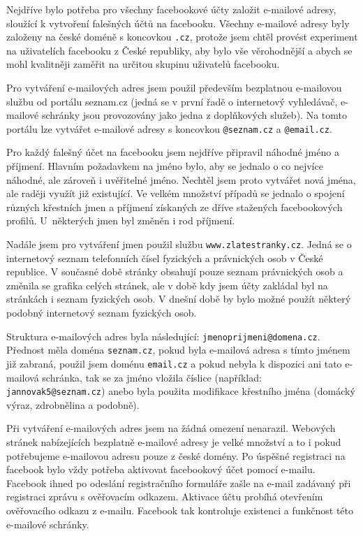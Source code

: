 \documentclass[thesis=M,czech]{FITthesis}[2013/05/10]
\begin{document}
Nejdříve bylo potřeba pro všechny facebookové účty založit e-mailové adresy, sloužící k vytvoření falešných účtů na facebooku. Všechny e-mailové adresy byly založeny na české doméně s koncovkou \verb|.cz|, protože jsem chtěl provést experiment na uživatelích facebooku z České republiky, aby bylo vše věrohodnější a abych se mohl kvalitněji zaměřit na určitou skupinu uživatelů facebooku. 

Pro vytváření e-mailových adres jsem použil především bezplatnou e-mailovou službu od portálu seznam.cz (jedná se v první řadě o internetový vyhledávač, e-mailové schránky jsou provozovány jako jedna z doplňkových služeb). Na tomto portálu lze vytvářet e-mailové adresy s koncovkou \verb|@seznam.cz| a \verb|@email.cz|.

Pro každý falešný účet na facebooku jsem nejdříve připravil náhodné jméno a příjmení. Hlavním požadavkem na jméno bylo, aby se jednalo o co nejvíce náhodné, ale zároveň i uvěřitelné jméno. Nechtěl jsem proto vytvářet nová jména, ale raději využít již existující. Ve velkém množství případů se jednalo o spojení různých křestních jmen a příjmení získaných ze dříve stažených facebookových profilů. U~některých jmen byl změněn i rod příjmení. 

Nadále jsem pro vytváření jmen použil službu \verb|www.zlatestranky.cz|. Jedná se o internetový seznam telefonních čísel fyzických a právnických osob v České republice. V současné době stránky obsahují pouze seznam právnických osob a změnila se grafika celých stránek, ale v době kdy jsem účty zakládal byl na stránkách i seznam fyzických osob. V dnešní době by bylo možné použít některý podobný internetový seznam fyzických osob.

Struktura e-mailových adres byla následující: \verb|jmenoprijmeni@domena.cz|. Přednost měla doména \verb|seznam.cz|, pokud byla e-mailová adresa s tímto jménem již zabraná, použil jsem doménu \verb|email.cz| a pokud nebyla k dispozici ani tato e-mailová schránka, tak se za jméno vložila číslice (například: \verb|jannovak5@seznam.cz|) anebo byla použita modifikace křestního jména (domácký výraz, zdrobnělina a podobně).

Při vytváření e-mailových adres jsem na žádná omezení nenarazil. Webových stránek nabízejících bezplatně e-mailové adresy je velké množství a to i pokud potřebujeme e-mailovou adresu pouze z české domény. Po úspěšné registraci na facebook bylo vždy potřeba aktivovat facebookový účet pomocí e-mailu. Facebook ihned po odeslání registračního formuláře zašle na e-mail zadávaný při registraci zprávu s ověřovacím odkazem. Aktivace účtu probíhá otevřením ověřovacího odkazu z e-mailu. Facebook tak kontroluje existenci a funkčnost této e-mailové schránky.
\end{document}
